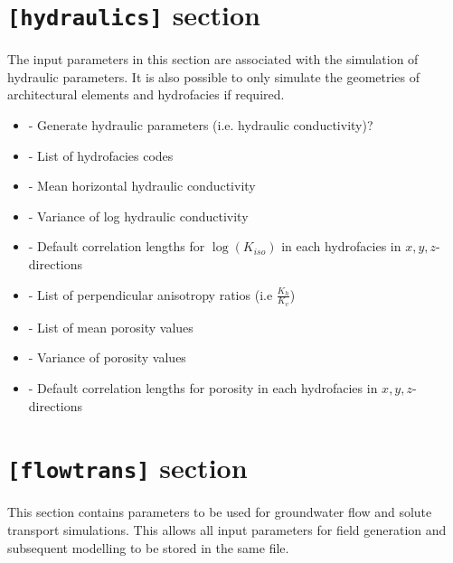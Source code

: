 \documentclass[letterpaper,10pt,english]{sphinxmanual}
\begin{document}
\section{\texttt{{[}hydraulics{]}} section}
\label{example:hydraulics-section}
The input parameters in this section are associated with the simulation of hydraulic parameters. It is also possible to only simulate the geometries of architectural elements and hydrofacies if required.
\begin{itemize}
\item {} 
                  - Generate hydraulic parameters (i.e. hydraulic conductivity)?

\item {} 
                   - List of hydrofacies codes

\item {} 
                     - Mean horizontal hydraulic conductivity

\item {} 
                   - Variance of log hydraulic conductivity

\item {} 
    - Default correlation lengths for \(\log(K_{iso})\) in each hydrofacies in \(x,y,z\)-directions

\item {} 
                 - List of perpendicular anisotropy ratios (i.e \(\frac{K_h}{K_v}\))

\item {} 
                               - List of mean porosity values

\item {} 
                   - Variance of porosity values

\item {} 
    - Default correlation lengths for porosity in each hydrofacies in \(x,y,z\)-directions

\end{itemize}


\section{\texttt{{[}flowtrans{]}} section}
\label{example:flowtrans-section}
This section contains parameters to be used for groundwater flow and solute transport simulations. This allows all input parameters for field generation and subsequent modelling to be stored in the same  file.
\end{document}
